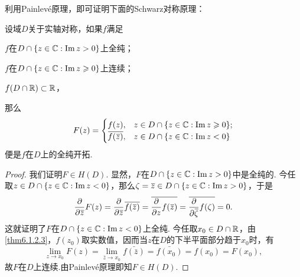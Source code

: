 利用Painlev\'e原理，即可证明下面的Schwarz对称原理：
\begin{theorem}\label{thm6.1.2}
  设域$D$关于实轴对称，如果$f$满足
  \begin{eenum}
    \item \label{thm6.1.2.1} $f$在$D\cap\{z\in\MC:\Im z>0\}$上全纯；
    \item \label{thm6.1.2.2} $f$在$D\cap\{z\in\MC:\Im z\ge0\}$上连续；
    \item \label{thm6.1.2.3} $f(D\cap\MR)\subset\MR$，
  \end{eenum}
  那么
  \[
    F(z) = \begin{cases}
    f(z), & z\in D \cap \{z\in \MC:\Im z\ge0\};\\
    \bar{f(\bar z)},&z\in D\cap \{z\in\MC:\Im z<0\}
    \end{cases}
  \]
  便是$f$在$D$上的全纯开拓.
\end{theorem}
\begin{proof}
  我们证明$F\in H(D)$. 显然，$F$在$D\cap\{z\in\MC:\Im z>0\}$中是全纯的. 今任取$z\in D\cap\{z\in\MC:\Im z<0\}$，那么$\zeta=\bar z\in D\cap\{z\in\MC:\Im z>0\}$，于是
  \[
    \pp{}{\bar z}F(z)=\pp{}{\bar z}\bar{f(\bar z)}=\bar{\pp{}zf(\bar z)}
    =\bar{\pp{}{\bar\zeta}f(\zeta)}=0.
  \]
  这就证明了$F$在$D\cap\{z\in\MC:\Im z<0\}$上全纯. 今任取$x_0\in D\cap\MR$，由 \ref{thm6.1.2.3}，$f(z_0)$取实数值，因而当$z$在$D$的下半平面部分趋于$x_0$时，有
  \[
    \lim_{z\to x_0}F(z) = \lim_{\bar z\to x_0}\bar{f(\bar z)} = \bar{f(x_0)}
    = f(x_0) = F(x_0),
  \]
  故$F$在$D$上连续.由Painlev\'e原理即知$F\in H(D)$.
\end{proof}


